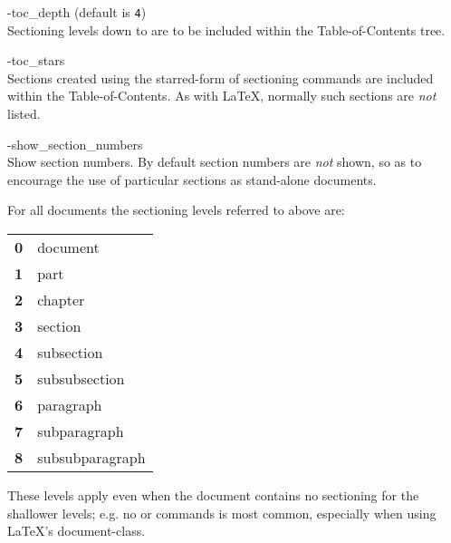 \begin{htmllist}
%

\begin{changebar}
\item [ -toc\_depth  \Meta{num}\label{tocdepth}]
 (default is \texttt{4})\\
Sectioning levels down to  are to be included 
within the Table-of-Contents tree.%

%

\item [ -toc\_stars\label{tocstars}]
\\
Sections created using the starred-form of sectioning commands
are included within the Table-of-Contents.
As with \LaTeX, normally such sections are \emph{not} listed.
%
\end{changebar}%

%

\item [ -show\_section\_numbers\label{showsecnums}]
\\
Show section numbers. By default section numbers are \emph{not} shown, 
so as to encourage the use of particular sections as stand-alone documents. 
%
\end{htmllist}

\goodbreak
{}\label{seclevels}%
\html{\\}\noindent
For all documents the sectioning levels referred to above are:\nobreak
\begin{center}
\begin{tabular}{ll}
\textbf{0} & document\\
\textbf{1} & part\\
\textbf{2} & chapter\\
\textbf{3} & section\\
\textbf{4} & subsection\\
\textbf{5} & subsubsection\\
\textbf{6} & paragraph\\
\textbf{7} & subparagraph\\
\textbf{8} & subsubparagraph
\end{tabular}
\end{center}
These levels apply even when the document contains no sectioning for
the shallower levels; e.g. no  or  commands is most common,
especially when using \LaTeX's  document-class.



